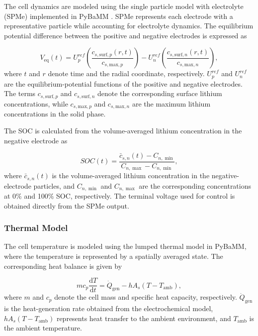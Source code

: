 \documentclass[10pt,journal,letterpaper]{IEEEtran}
\begin{document}
The cell dynamics are modeled using the single particle model with electrolyte (SPMe) implemented in PyBaMM \cite{23,25}. SPMe represents each electrode with a representative particle while accounting for electrolyte dynamics. The equilibrium potential difference between the positive and negative electrodes is expressed as

\begin{equation}\label{eq:voltage}
    V_{\mathrm{eq}}(t)
    =
    U^{ref}_{p}
    \left(
    \frac{c_{s,\mathrm{surf},p}(r,t)}
    {c_{s,\mathrm{max},p}}
    \right)
    -
    U^{ref}_{n}
    \left(
    \frac{c_{s,\mathrm{surf},n}(r,t)}
    {c_{s,\mathrm{max},n}}
    \right),
\end{equation}
where $t$ and $r$ denote time and the radial coordinate, respectively.
$U^{ref}_{p}$ and $U^{ref}_{n}$ are the equilibrium-potential functions of the positive and negative electrodes.
The terms $c_{s,\mathrm{surf},p}$ and $c_{s,\mathrm{surf},n}$ denote the corresponding surface lithium concentrations, while $c_{s,\mathrm{max},p}$ and $c_{s,\mathrm{max},n}$ are the maximum lithium concentrations in the solid phase.

The SOC is calculated from the volume-averaged lithium concentration in the negative electrode as

\begin{equation}\label{eq:soc}
    SOC(t)
    =
    \frac{\bar{c}_{s,n}(t)-C_{n,\min}}
    {C_{n,\max}-C_{n,\min}},
\end{equation}
where $\bar{c}_{s,n}(t)$ is the volume-averaged lithium concentration in the negative-electrode particles, and $C_{n,\min}$ and $C_{n,\max}$ are the corresponding concentrations at 0\% and 100\% SOC, respectively. The terminal voltage used for control is obtained directly from the SPMe output.

\subsubsection{Thermal Model}

The cell temperature is modeled using the lumped thermal model in PyBaMM, where the temperature is represented by a spatially averaged state. The corresponding heat balance is given by

\begin{equation}\label{eq:thermal}
    m c_p \frac{\mathrm{d}T}{\mathrm{d}t}
    =
    \dot{Q}_{\mathrm{gen}}
    -
    hA_s\left(T-T_{\mathrm{amb}}\right),
\end{equation}
where $m$ and $c_p$ denote the cell mass and specific heat capacity, respectively.
$\dot{Q}_{\mathrm{gen}}$ is the heat-generation rate obtained from the electrochemical model, $hA_s(T-T_{\mathrm{amb}})$ represents heat transfer to the ambient environment, and $T_{\mathrm{amb}}$ is the ambient temperature.
\end{document}
